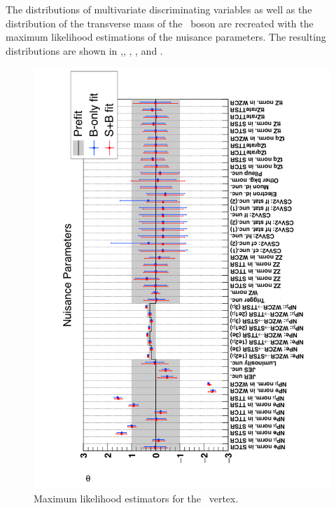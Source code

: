   The distributions of multivariate discriminating  variables as well as the distribution of the transverse mass of the \PW\ boson are recreated with the maximum likelihood estimations of the nuisance parameters. The resulting distributions are shown in ,, , , and . %







\begin{figure}[htbp]
	\centering
	\includegraphics[width=1.\linewidth]{6_Search/Figures/impact/171102ZctMLE.pdf}
	\caption{Maximum likelihood estimators for the \Zct\ vertex.}
	\label{fig:171102zctmle}
\end{figure}
